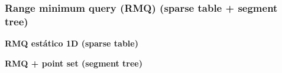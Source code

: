 \subsubsection{Range minimum query (RMQ) (sparse table + segment tree)}
    \textbf{RMQ estático 1D (sparse table)}
    

    \textbf{RMQ + point set (segment tree)}
    
